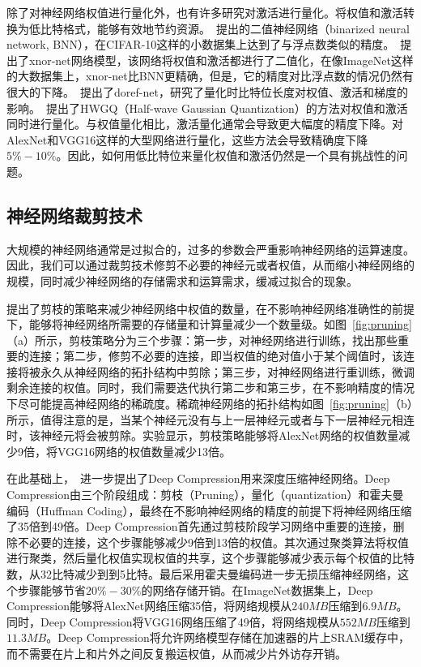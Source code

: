 除了对神经网络权值进行量化外，也有许多研究对激活进行量化。将权值和激活转换为低比特格式，能够有效地节约资源。~\citet{hubara2016binarized}提出的二值神经网络（binarized neural network, BNN），在CIFAR-10这样的小数据集上达到了与浮点数类似的精度。~\citet{rastegari2016xnor}提出了xnor-net网络模型，该网络将权值和激活都进行了二值化，在像ImageNet这样的大数据集上，xnor-net比BNN更精确，但是，它的精度对比浮点数的情况仍然有很大的下降。~\citet{zhou2016dorefa}提出了doref-net，研究了量化时比特位长度对权值、激活和梯度的影响。~\citet{cai2017deep}提出了HWGQ（Half-wave Gaussian Quantization）的方法对权值和激活同时进行量化。与权值量化相比，激活量化通常会导致更大幅度的精度下降。对AlexNet和VGG16这样的大型网络进行量化，这些方法会导致精确度下降$5\% - 10\%$。因此，如何用低比特位来量化权值和激活仍然是一个具有挑战性的问题。


\subsection{神经网络裁剪技术}
大规模的神经网络通常是过拟合的，过多的参数会严重影响神经网络的运算速度。因此，我们可以通过裁剪技术修剪不必要的神经元或者权值，从而缩小神经网络的规模，同时减少神经网络的存储需求和运算需求，缓减过拟合的现象。

\citet{han2015learning}提出了剪枝的策略来减少神经网络中权值的数量，在不影响神经网络准确性的前提下，能够将神经网络所需要的存储量和计算量减少一个数量级。如图~\ref{fig:pruning}（a）所示，剪枝策略分为三个步骤：第一步，对神经网络进行训练，找出那些重要的连接；第二步，修剪不必要的连接，即当权值的绝对值小于某个阈值时，该连接将被永久从神经网络的拓扑结构中剪除；第三步，对神经网络进行重训练，微调剩余连接的权值。同时，我们需要迭代执行第二步和第三步，在不影响精度的情况下尽可能提高神经网络的稀疏度。稀疏神经网络的拓扑结构如图~\ref{fig:pruning}（b）所示，值得注意的是，当某个神经元没有与上一层神经元或者与下一层神经元相连时，该神经元将会被剪除。实验显示，剪枝策略能够将AlexNet网络的权值数量减少9倍，将VGG16网络的权值数量减少13倍。

在此基础上，~\citet{han2015deep}进一步提出了Deep Compression用来深度压缩神经网络。Deep Compression由三个阶段组成：剪枝（Pruning），量化（quantization）和霍夫曼编码（Huffman Coding），最终在不影响神经网络的精度的前提下将神经网络压缩了35倍到49倍。Deep Compression首先通过剪枝阶段学习网络中重要的连接，删除不必要的连接，这个步骤能够减少9倍到13倍的权值。其次通过聚类算法将权值进行聚类，然后量化权值实现权值的共享，这个步骤能够减少表示每个权值的比特数，从32比特减少到到5比特。最后采用霍夫曼编码进一步无损压缩神经网络，这个步骤能够节省$20\%-30\%$的网络存储开销。在ImageNet数据集上，Deep Compression能够将AlexNet网络压缩35倍，将网络规模从$240MB$压缩到$6.9MB$。同时，Deep Compression将VGG16网络压缩了49倍，将网络规模从$552MB$压缩到$11.3MB$。Deep Compression将允许网络模型存储在加速器的片上SRAM缓存中，而不需要在片上和片外之间反复搬运权值，从而减少片外访存开销。

